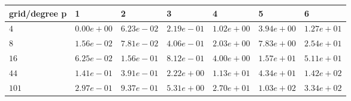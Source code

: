 \begin{tabular}{lllllll}
\hline
 grid/degree p   & 1          & 2          & 3          & 4          & 5          & 6          \\
\hline
 $4$             & $0.00e+00$ & $6.23e-02$ & $2.19e-01$ & $1.02e+00$ & $3.94e+00$ & $1.27e+01$ \\
 $8$             & $1.56e-02$ & $7.81e-02$ & $4.06e-01$ & $2.03e+00$ & $7.83e+00$ & $2.54e+01$ \\
 $16$            & $6.25e-02$ & $1.56e-01$ & $8.12e-01$ & $4.00e+00$ & $1.57e+01$ & $5.11e+01$ \\
 $44$            & $1.41e-01$ & $3.91e-01$ & $2.22e+00$ & $1.13e+01$ & $4.34e+01$ & $1.42e+02$ \\
 $101$           & $2.97e-01$ & $9.37e-01$ & $5.31e+00$ & $2.70e+01$ & $1.03e+02$ & $3.34e+02$ \\
\hline
\end{tabular}